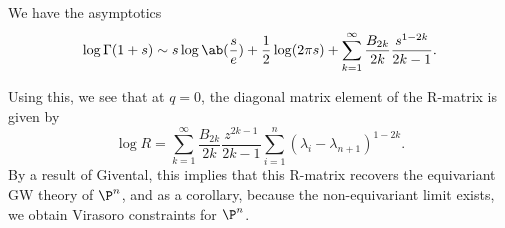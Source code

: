 \begin{lem}
    We have the asymptotics
    \[ \log \Gamma(1+s) \sim s \log \ab(\frac{s}{e}) + \frac{1}{2} \log(2\pi s) + \sum_{k=1}^{\infty} \frac{B_{2k}}{2k} \frac{s^{1-2k}}{2k-1}. \]
\end{lem}
Using this, we see that at \(q = 0\), the diagonal matrix element of the R-matrix is given by
\[ \log R = \sum_{k=1}^{\infty} \frac{B_{2k}}{2k} \frac{z^{2k-1}}{2k-1} \sum_{i =1}^n (\lambda_i - \lambda_{n+1})^{1-2k}. \]
By a result of Givental, this implies that this R-matrix recovers the equivariant GW theory of \(\P^n\), and as a corollary, because the non-equivariant limit exists, we obtain Virasoro constraints for \(\P^n\). 

